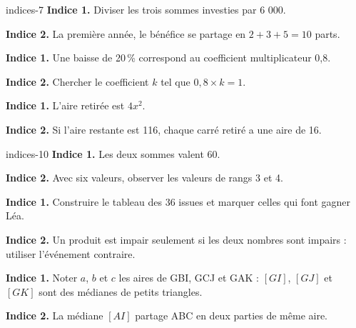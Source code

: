\begin{blocEdition}{indices-7}
\textbf{Indice 1.} Diviser les trois sommes investies par 6 000.\par\medskip\textbf{Indice 2.} La première année, le bénéfice se partage en $2+3+5=10$ parts.\par
{}\textbf{Indice 1.} Une baisse de 20\,\% correspond au coefficient multiplicateur 0,8.\par\medskip\textbf{Indice 2.} Chercher le coefficient $k$ tel que $0{,}8\times k=1$.\par
{}\textbf{Indice 1.} L’aire retirée est $4x^2$.\par\medskip\textbf{Indice 2.} Si l’aire restante est 116, chaque carré retiré a une aire de 16.\par

\end{blocEdition}
\begin{blocEdition}{indices-10}
\textbf{Indice 1.} Les deux sommes valent 60.\par\medskip\textbf{Indice 2.} Avec six valeurs, observer les valeurs de rangs 3 et 4.\par
{}\textbf{Indice 1.} Construire le tableau des 36 issues et marquer celles qui font gagner Léa.\par\medskip\textbf{Indice 2.} Un produit est impair seulement si les deux nombres sont impairs : utiliser l’événement contraire.\par
{}\textbf{Indice 1.} Noter $a$, $b$ et $c$ les aires de GBI, GCJ et GAK : $[GI]$, $[GJ]$ et $[GK]$ sont des médianes de petits triangles.\par\medskip\textbf{Indice 2.} La médiane $[AI]$ partage ABC en deux parties de même aire.\par

\end{blocEdition}

